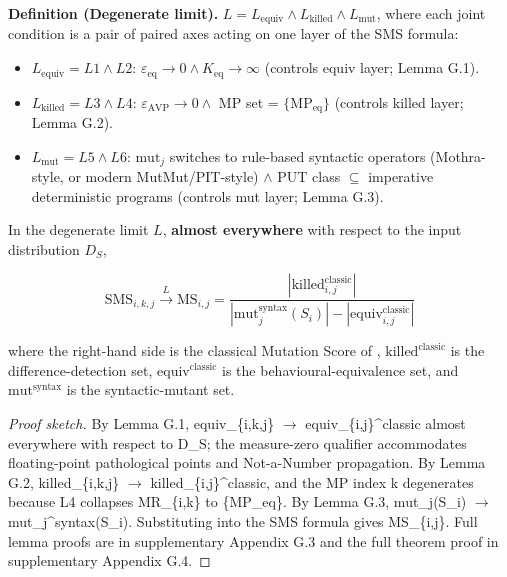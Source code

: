 \documentclass[manuscript,screen,review]{acmart}
\begin{document}
\textbf{Definition (Degenerate limit).}
$L = L_{\mathrm{equiv}} \wedge L_{\mathrm{killed}} \wedge L_{\mathrm{mut}}$, where each joint
condition is a pair of paired axes acting on one layer of the SMS
formula:

\begin{itemize}

\item
  $L_{\mathrm{equiv}} = L1 \wedge L2$: $\varepsilon_{\mathrm{eq}} \to 0 \wedge K_{\mathrm{eq}} \to \infty$ (controls equiv
  layer; Lemma G.1).
\item
  $L_{\mathrm{killed}} = L3 \wedge L4$: $\varepsilon_{\mathrm{AVP}} \to 0 \wedge$ MP set = $\{\mathrm{MP}_{\mathrm{eq}}\}$
  (controls killed layer; Lemma G.2).
\item
  $L_{\mathrm{mut}} = L5 \wedge L6$: $\mathrm{mut}_j$ switches to rule-based syntactic
  operators (Mothra-style, or modern MutMut/PIT-style) $\wedge$ PUT class $\subseteq$ imperative deterministic
  programs (controls mut layer; Lemma G.3).
\end{itemize}

\begin{theorem}\label{thm:degeneration}
In the degenerate limit
$L$, \textbf{almost everywhere} with respect to the input
distribution $D_S$,

\[ \mathrm{SMS}_{i,k,j} \xrightarrow{L} \mathrm{MS}_{i,j} = \frac{|\mathrm{killed}_{i,j}^{\mathrm{classic}}|}{|\mathrm{mut}_j^{\mathrm{syntax}}(S_i)| - |\mathrm{equiv}_{i,j}^{\mathrm{classic}}|} \]

where the right-hand side is the classical Mutation Score of
\citet{jia2011analysis},
$\mathrm{killed}^{\mathrm{classic}}$ is the difference-detection set,
$\mathrm{equiv}^{\mathrm{classic}}$ is the behavioural-equivalence set,
and $\mathrm{mut}^{\mathrm{syntax}}$ is the syntactic-mutant set.
\end{theorem}

\begin{proof}[Proof sketch]
By Lemma G.1, equiv\_\{i,k,j\} $\to$
equiv\_\{i,j\}\^{}classic almost everywhere with respect to D\_S; the
measure-zero qualifier accommodates floating-point pathological points
and Not-a-Number propagation. By Lemma G.2, killed\_\{i,k,j\} $\to$
killed\_\{i,j\}\^{}classic, and the MP index k degenerates because L4
collapses MR\_\{i,k\} to \{MP\_eq\}. By Lemma G.3, mut\_j(S\_i) $\to$
mut\_j\^{}syntax(S\_i). Substituting into the SMS formula gives
MS\_\{i,j\}. Full lemma proofs are in supplementary Appendix G.3 and the
full theorem proof in supplementary Appendix G.4.
\end{proof}
\end{document}
